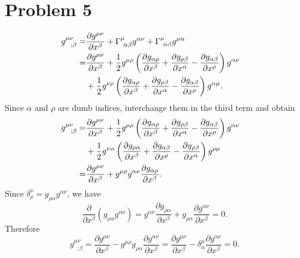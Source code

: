 \documentclass{article}
\begin{document}
\section*{Problem 5}
\begin{align}
g^{\mu\nu}_{~~;\beta} =& \frac{\partial g^{\mu\nu}}{\partial x^\beta}
+\Gamma^\mu_{~\alpha\beta}g^{\alpha \nu}
+\Gamma^\nu_{~\alpha\beta}g^{\mu \alpha}\cr
= &  \frac{\partial g^{\mu\nu}}{\partial x^\beta}
+ \frac{1}{2} g^{\mu \rho}
\left(
\frac{\partial g_{\alpha \rho}}{\partial x^\beta}
+\frac{\partial g_{\rho \beta}}{\partial x^\alpha}
-\frac{\partial g_{\alpha \beta}}{\partial x^\rho}
\right) g^{\alpha \nu}\cr
&+\frac{1}{2} g^{\nu \rho}
\left(
\frac{\partial g_{\alpha \rho}}{\partial x^\beta}
+\frac{\partial g_{\rho \beta}}{\partial x^\alpha}
-\frac{\partial g_{\alpha \beta}}{\partial x^\rho}
\right) g^{\alpha \mu}.
\end{align}
Since $\alpha$ and $\rho$ are dumb indices, interchange them in the third term and obtain
\begin{align}
g^{\mu\nu}_{~~;\beta} 
= &  \frac{\partial g^{\mu\nu}}{\partial x^\beta}
+ \frac{1}{2} g^{\mu \rho}
\left(
\frac{\partial g_{\alpha \rho}}{\partial x^\beta}
+\frac{\partial g_{\rho \beta}}{\partial x^\alpha}
-\frac{\partial g_{\alpha \beta}}{\partial x^\rho}
\right) g^{\alpha \nu}\cr
&+\frac{1}{2} g^{\nu \alpha}
\left(
\frac{\partial g_{\rho \alpha}}{\partial x^\beta}
+\frac{\partial g_{\alpha \beta}}{\partial x^\rho}
-\frac{\partial g_{\rho\beta}}{\partial x^\alpha}
\right) g^{\rho \mu}\cr
=& \frac{\partial g^{\mu\nu}}{\partial x^\beta}
+ g^{\mu \rho} g^{\alpha \nu} \frac{\partial g_{\alpha \rho}}{\partial x^\beta}.
\end{align}
Since $\delta^\nu_\rho = g_{\rho \alpha} g^{\alpha \nu}$, we have
\begin{equation}
\frac{\partial}{\partial x^\beta}\left(g_{\rho \alpha} g^{\alpha \nu}\right)
=g^{\alpha \nu}\frac{\partial g_{\rho \alpha}}{\partial x^\beta}
+g_{\rho \alpha}\frac{\partial g^{\alpha \nu}}{\partial x^\beta}
=0.
\end{equation}
Therefore 
\begin{equation}
g^{\mu \nu}_{~~;\beta}=\frac{\partial g^{\mu \nu}}{\partial x^\beta}
-g^{\mu \rho}g_{\rho \alpha}\frac{\partial g^{\alpha \nu}}{\partial x^\beta}
=\frac{\partial g^{\mu \nu}}{\partial x^\beta}
-\delta^\mu_\alpha\frac{\partial g^{\alpha \nu}}{\partial x^\beta}
=0.
\end{equation}
\end{document}
